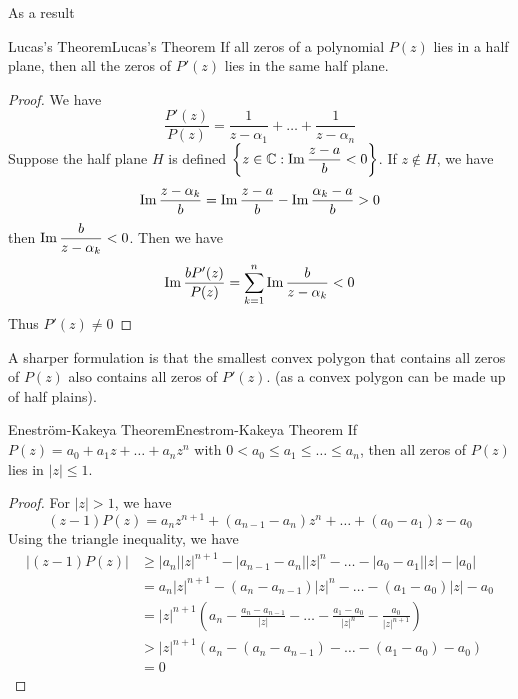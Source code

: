 \documentclass[../main.tex]{subfiles}
\begin{document}
As a result
\begin{theorem}{Lucas's Theorem}{Lucas's Theorem}
If all zeros of a polynomial $P(z)$ lies in a half plane, then all the zeros of $P'(z)$ lies in the same half plane.
\end{theorem}
\begin{proof}
We have
\begin{equation}
\frac{P'(z)}{P(z)} = \frac{1}{z-\alpha_1}+\ldots +\frac{1}{z-\alpha_n}
\end{equation}
Suppose the half plane $H$ is defined $\displaystyle \left\{ z\in \mathbb{C}: \operatorname{Im} \frac{z-a}{b}<0 \right\}$. If $z\notin H$, we have
\begin{equation*}
\operatorname{Im} \frac{z-\alpha_k}{b} = \operatorname{Im} \frac{z-a}{b}-\operatorname{Im} \frac{\alpha_k-a}{b} > 0
\end{equation*}
then $\displaystyle \operatorname{Im} \frac{b}{z-\alpha_k}<0$. Then we have
\begin{equation*}
\operatorname{Im} \frac{bP'(z)}{P(z)} = \sum_{k=1}^{n} \operatorname{Im} \frac{b}{z-\alpha_k}<0
\end{equation*}
Thus $P'(z)\neq 0$
\end{proof}

A sharper formulation is that the smallest convex polygon that contains all zeros of $P(z)$ also contains all zeros of $P'(z)$. (as a convex polygon can be made up of half plains).

\begin{theorem}{Enestr\"om-Kakeya Theorem}{Enestrom-Kakeya Theorem}
If $P(z) = a_0+a_1z+\ldots +a_nz^n$ with $0<a_0\leq a_1\leq \ldots \leq a_n$, then all zeros of $P(z)$ lies in $\left|z\right|\leq 1$.
\end{theorem}
\begin{proof}
	For $\left|z\right|>1$, we have
	\begin{equation*}
		(z-1)P(z) = a_nz^{n+1} + (a_{n-1}-a_n)z^n + \ldots + (a_0-a_1)z - a_0
	\end{equation*}
	Using the triangle inequality, we have
	\begin{equation*}
		\begin{aligned}
			\left|(z-1)P(z)\right| &\geq \left|a_n\right|\left|z\right|^{n+1} - \left|a_{n-1}-a_n\right|\left|z\right|^n - \ldots - \left|a_0-a_1\right|\left|z\right| - \left|a_0\right| \\
			&= a_n \left|z\right|^{n+1} - (a_n - a_{n-1})\left|z\right|^n - \ldots - (a_1 - a_0)\left|z\right| - a_0 \\
			&= \left|z\right|^{n+1} \left(a_n - \frac{a_n - a_{n-1}}{\left|z\right|} - \ldots - \frac{a_1 - a_0}{\left|z\right|^n} - \frac{a_0}{\left|z\right|^{n+1}}\right) \\
			&> \left|z\right|^{n+1} \left(a_n - (a_n - a_{n-1}) - \ldots - (a_1 - a_0) - a_0\right) \\
			&= 0
		\end{aligned}
	\end{equation*}
\end{proof}
\end{document}
